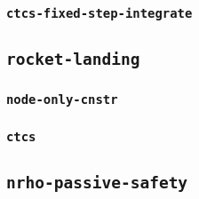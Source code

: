 \documentclass[11pt,a4paper]{article}
\begin{document}
\subsubsection{\texttt{ctcs-fixed-step-integrate}}

\subsection{\texttt{rocket-landing}}

\subsubsection{\texttt{node-only-cnstr}}

\subsubsection{\texttt{ctcs}}

\subsection{\texttt{nrho-passive-safety}}
\end{document}
